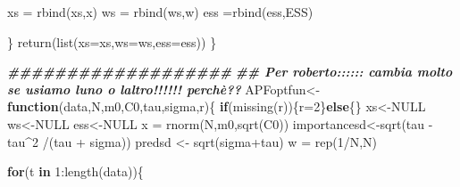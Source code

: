 \documentclass[
]{book}
\newenvironment{Shaded}{\begin{snugshade}}{\end{snugshade}}
\newcommand{\AttributeTok}[1]{\textcolor[rgb]{0.77,0.63,0.00}{#1}}
\newcommand{\ConstantTok}[1]{\textcolor[rgb]{0.00,0.00,0.00}{#1}}
\newcommand{\ControlFlowTok}[1]{\textcolor[rgb]{0.13,0.29,0.53}{\textbf{#1}}}
\newcommand{\DecValTok}[1]{\textcolor[rgb]{0.00,0.00,0.81}{#1}}
\newcommand{\DocumentationTok}[1]{\textcolor[rgb]{0.56,0.35,0.01}{\textbf{\textit{#1}}}}
\newcommand{\FunctionTok}[1]{\textcolor[rgb]{0.00,0.00,0.00}{#1}}
\newcommand{\NormalTok}[1]{#1}
\newcommand{\OtherTok}[1]{\textcolor[rgb]{0.56,0.35,0.01}{#1}}
\newcommand{\SpecialCharTok}[1]{\textcolor[rgb]{0.00,0.00,0.00}{#1}}
\theoremstyle{break}
\theoremstyle{nonumberplain}
\begin{document}
\begin{Shaded}
\begin{Highlighting}[]
    
\NormalTok{    xs }\OtherTok{=} \FunctionTok{rbind}\NormalTok{(xs,x)}
\NormalTok{    ws }\OtherTok{=} \FunctionTok{rbind}\NormalTok{(ws,w)}
\NormalTok{    ess }\OtherTok{=}\FunctionTok{rbind}\NormalTok{(ess,ESS)}
    
\NormalTok{  \}}
  \FunctionTok{return}\NormalTok{(}\FunctionTok{list}\NormalTok{(}\AttributeTok{xs=}\NormalTok{xs,}\AttributeTok{ws=}\NormalTok{ws,}\AttributeTok{ess=}\NormalTok{ess))}
\NormalTok{\}}
\end{Highlighting}
\end{Shaded}

\begin{Shaded}
\begin{Highlighting}[]
\DocumentationTok{\#\#\#\#\#\#\#\#\#\#\#\#\#\#\#\#\#\#\#}
\DocumentationTok{\#\# Per roberto:::::: cambia molto se usiamo l\textquotesingle{}uno o l\textquotesingle{}altro!!!!!! perchè??}
\NormalTok{APFoptfun}\OtherTok{\textless{}{-}}\ControlFlowTok{function}\NormalTok{(data,N,m0,C0,tau,sigma,r)\{}
  \ControlFlowTok{if}\NormalTok{(}\FunctionTok{missing}\NormalTok{(r))\{r}\OtherTok{=}\DecValTok{2}\NormalTok{\}}\ControlFlowTok{else}\NormalTok{\{\}}
\NormalTok{  xs}\OtherTok{\textless{}{-}}\ConstantTok{NULL}
\NormalTok{  ws}\OtherTok{\textless{}{-}}\ConstantTok{NULL}
\NormalTok{  ess}\OtherTok{\textless{}{-}}\ConstantTok{NULL}
\NormalTok{  x  }\OtherTok{=} \FunctionTok{rnorm}\NormalTok{(N,m0,}\FunctionTok{sqrt}\NormalTok{(C0))}
\NormalTok{  importancesd}\OtherTok{\textless{}{-}}\FunctionTok{sqrt}\NormalTok{(tau }\SpecialCharTok{{-}}\NormalTok{ tau}\SpecialCharTok{\^{}}\DecValTok{2} \SpecialCharTok{/}\NormalTok{(tau }\SpecialCharTok{+}\NormalTok{ sigma))}
\NormalTok{  predsd }\OtherTok{\textless{}{-}} \FunctionTok{sqrt}\NormalTok{(sigma}\SpecialCharTok{+}\NormalTok{tau)}
\NormalTok{  w  }\OtherTok{=} \FunctionTok{rep}\NormalTok{(}\DecValTok{1}\SpecialCharTok{/}\NormalTok{N,N)}
  
  \ControlFlowTok{for}\NormalTok{(t }\ControlFlowTok{in} \DecValTok{1}\SpecialCharTok{:}\FunctionTok{length}\NormalTok{(data))\{}
    

\end{Highlighting}
\end{Shaded}
\end{document}
